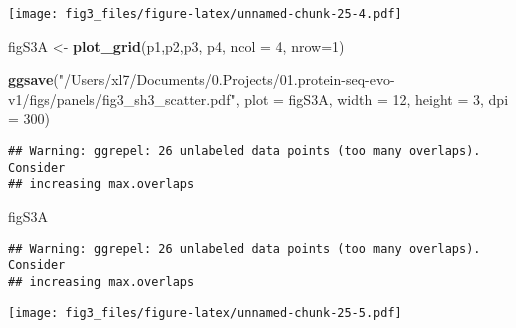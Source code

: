 \documentclass[
]{article}
\newenvironment{Shaded}{\begin{snugshade}}{\end{snugshade}}
\newcommand{\AttributeTok}[1]{\textcolor[rgb]{0.13,0.29,0.53}{#1}}
\newcommand{\DecValTok}[1]{\textcolor[rgb]{0.00,0.00,0.81}{#1}}
\newcommand{\FunctionTok}[1]{\textcolor[rgb]{0.13,0.29,0.53}{\textbf{#1}}}
\newcommand{\NormalTok}[1]{#1}
\newcommand{\OtherTok}[1]{\textcolor[rgb]{0.56,0.35,0.01}{#1}}
\newcommand{\StringTok}[1]{\textcolor[rgb]{0.31,0.60,0.02}{#1}}
\begin{document}
\texttt{[image: fig3\_files/figure-latex/unnamed-chunk-25-4.pdf]}

\begin{Shaded}
\begin{Highlighting}[]
\NormalTok{figS3A }\OtherTok{\textless{}{-}} \FunctionTok{plot\_grid}\NormalTok{(p1,p2,p3, p4, }\AttributeTok{ncol =} \DecValTok{4}\NormalTok{, }\AttributeTok{nrow=}\DecValTok{1}\NormalTok{)}

\FunctionTok{ggsave}\NormalTok{(}\StringTok{"/Users/xl7/Documents/0.Projects/01.protein{-}seq{-}evo{-}v1/figs/panels/fig3\_sh3\_scatter.pdf"}\NormalTok{, }
       \AttributeTok{plot =}\NormalTok{ figS3A, }\AttributeTok{width =} \DecValTok{12}\NormalTok{, }\AttributeTok{height =} \DecValTok{3}\NormalTok{, }\AttributeTok{dpi =} \DecValTok{300}\NormalTok{)}
\end{Highlighting}
\end{Shaded}

\begin{verbatim}
## Warning: ggrepel: 26 unlabeled data points (too many overlaps). Consider
## increasing max.overlaps
\end{verbatim}

\begin{Shaded}
\begin{Highlighting}[]
\NormalTok{figS3A}
\end{Highlighting}
\end{Shaded}

\begin{verbatim}
## Warning: ggrepel: 26 unlabeled data points (too many overlaps). Consider
## increasing max.overlaps
\end{verbatim}

\texttt{[image: fig3\_files/figure-latex/unnamed-chunk-25-5.pdf]}
\end{document}
